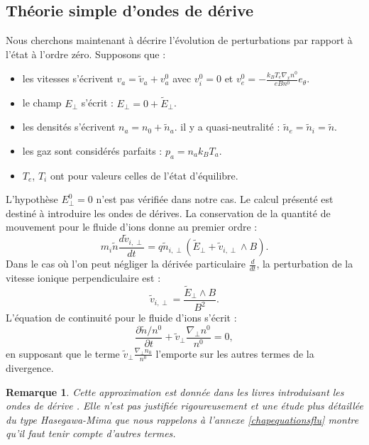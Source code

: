 \documentclass{book}
\newtheorem{rem}{Remarque}[chapter]
\begin{document}
\subsection{Th\'eorie simple d'ondes de d\'erive}
Nous cherchons maintenant \`a d\'ecrire
l'\'evolution de perturbations 
par rapport \`a l'\'etat \`a l'ordre z\'ero.
Supposons que :
\begin{itemize}
\item les vitesses s'\'ecrivent $v_a=\tilde{v}_a+v_a^0$
avec $v_i^0=0$ et $v_e^0=-\frac{k_B T_e \nabla_x n^0}{e B n^0} e_{\theta}$.
\item le champ $E_\perp$ s'\'ecrit : $E_\perp=0+\tilde{E}_\perp$.
\item les densit\'es s'\'ecrivent $n_a=n_0+\tilde{n}_a$. 
 il y a quasi-neutralit\'e : $\tilde{n}_e=\tilde{n}_i=\tilde{n}$.
\item les gaz sont consid\'er\'es 
parfaits  : $p_a=n_ak_BT_a$.
\item $T_e$, $T_i$ ont pour valeurs celles de l'\'etat d'\'equilibre.
\end{itemize}
L'hypoth\`ese $E_\perp^0=0$ n'est pas v\'erifi\'ee dans notre cas. Le
calcul pr\'esent\'e \cite{Chen84,Mikhailovsky83} est destin\'e \`a introduire les ondes de d\'erives.
La conservation 
 de la quantit\'e de mouvement pour le fluide d'ions donne
au premier ordre :
\begin{equation}
m_i\tilde{n}\frac{d\tilde{v}_{i,\perp}}{dt} =
q\tilde{n}_{i,\perp}(\tilde{E}_{\perp}+\tilde{v}_{i,\perp}\wedge B). 
\end{equation}
Dans le cas o\`u l'on peut n\'egliger la d\'eriv\'ee particulaire
$\frac{d}{dt}$, la perturbation de la vitesse ionique perpendiculaire
est :
\begin{equation}
\tilde{v}_{i,\perp}=\frac{\tilde{E}_\perp\wedge B}{B^2}.
\end{equation}
L'\'equation de continuit\'e pour le fluide d'ions s'\'ecrit :
\begin{equation}\label{eqcontele}
\frac{\partial\tilde{n}/n^0}{\partial
t}+\tilde{v}_\perp\frac{\nabla_\perp{n^0}}{n^0}=0,
\end{equation}
en supposant que le terme $\tilde{v}_\perp\frac{\nabla_\perp{n_0}}{n^0}$
l'emporte sur les autres termes de la divergence.

\begin{rem}
Cette approximation est donn\'ee dans les livres introduisant les
ondes de d\'erive
\cite{Chen84,Mikhailovsky83}. Elle n'est pas 
justifi\'ee 
rigoureusement et une \'etude plus d\'etaill\'ee du type Hasegawa-Mima 
que nous rappelons \`a l'annexe \ref{chapequationsflu} montre qu'il
faut tenir 
compte d'autres termes.
\end{rem}
\end{document}
